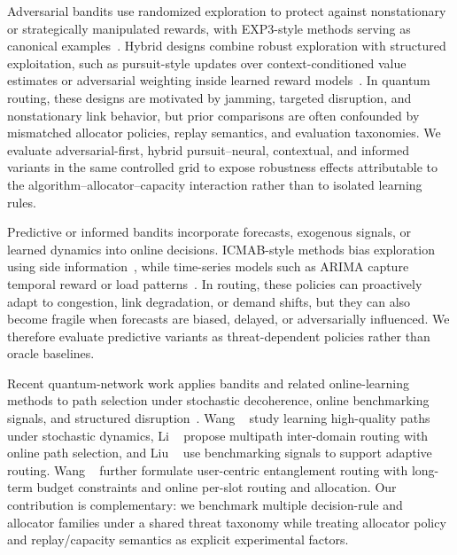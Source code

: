 Adversarial bandits use randomized exploration to protect against nonstationary or strategically manipulated rewards, with EXP3-style methods serving as canonical examples~\cite{auer2002nonstochastic}. Hybrid designs combine robust exploration with structured exploitation, such as pursuit-style updates over context-conditioned value estimates or adversarial weighting inside learned reward models~\cite{thathachar2011networks}. In quantum routing, these designs are motivated by jamming, targeted disruption, and nonstationary link behavior, but prior comparisons are often confounded by mismatched allocator policies, replay semantics, and evaluation taxonomies. We evaluate adversarial-first, hybrid pursuit--neural, contextual, and informed variants in the same controlled grid to expose robustness effects attributable to the algorithm--allocator--capacity interaction rather than to isolated learning rules.


Predictive or informed bandits incorporate forecasts, exogenous signals, or learned dynamics into online decisions. ICMAB-style methods bias exploration using side information~\cite{kar2024icmab}, while time-series models such as ARIMA capture temporal reward or load patterns~\cite{box2015time}. In routing, these policies can proactively adapt to congestion, link degradation, or demand shifts, but they can also become fragile when forecasts are biased, delayed, or adversarially influenced. We therefore evaluate predictive variants as threat-dependent policies rather than oracle baselines.


Recent quantum-network work applies bandits and related online-learning methods to path selection under stochastic decoherence, online benchmarking signals, and structured disruption~\cite{wehner2018quantum,huang2024quantum,wang2025learning,li2025multipath,liu2024qbgp}. Wang \etal~\cite{wang2025learning} study learning high-quality paths under stochastic dynamics, Li \etal~\cite{li2025multipath} propose multipath inter-domain routing with online path selection, and Liu \etal~\cite{liu2024qbgp} use benchmarking signals to support adaptive routing. Wang \etal~\cite{wang2024adaptive} further formulate user-centric entanglement routing with long-term budget constraints and online per-slot routing and allocation. Our contribution is complementary: we benchmark multiple decision-rule and allocator families under a shared threat taxonomy while treating allocator policy and replay/capacity semantics as explicit experimental factors.

